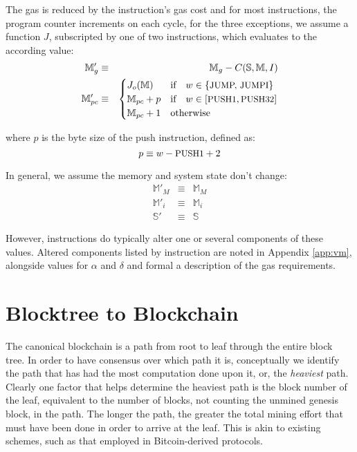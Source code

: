 \documentclass[9pt,oneside]{amsart}
\begin{document}
\begin{multicols}{2}
The gas is reduced by the instruction's gas cost and for most instructions, the program counter increments on each cycle, for the three exceptions, we assume a function $J$, subscripted by one of two instructions, which evaluates to the according value:
\begin{eqnarray}
\mathbb{M}'_{g} & \equiv & \mathbb{M}_{g} - C(\mathbb{S}, \mathbb{M}, I) \\
\mathbb{M}'_{pc} & \equiv & \begin{cases}
J_o(\mathbb{M}) & \text{if} \quad w \in \{ \text{\small JUMP, JUMPI} \} \\
\mathbb{M}_{pc} + p & \text{if} \quad w \in [\text{\small PUSH1}, \text{\small PUSH32}] \\
\mathbb{M}_{pc} + 1 & \text{otherwise}
\end{cases}
\end{eqnarray}

where $p$ is the byte size of the push instruction, defined as:
\begin{equation}
p \equiv w - \text{\small PUSH1} + 2
\end{equation}

In general, we assume the memory and system state don't change:
\begin{eqnarray}
\mathbb{M}'_M & \equiv & \mathbb{M}_M \\
\mathbb{M}'_i & \equiv & \mathbb{M}_i \\
\mathbb{S}' & \equiv & \mathbb{S}
\end{eqnarray}

However, instructions do typically alter one or several components of these values. Altered components listed by instruction are noted in Appendix \ref{app:vm}, alongside values for $\alpha$ and $\delta$ and formal a description of the gas requirements.

\section{Blocktree to Blockchain} \label{ch:ghost}

The canonical blockchain is a path from root to leaf through the entire block tree. In order to have consensus over which path it is, conceptually we identify the path that has had the most computation done upon it, or, the \textit{heaviest} path. Clearly one factor that helps determine the heaviest path is the block number of the leaf, equivalent to the number of blocks, not counting the unmined genesis block, in the path. The longer the path, the greater the total mining effort that must have been done in order to arrive at the leaf. This is akin to existing schemes, such as that employed in Bitcoin-derived protocols.


\end{multicols}
\end{document}
